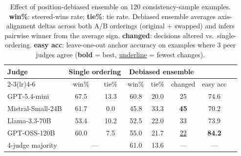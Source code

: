 \begin{table}[t]\centering\small
\setlength{\tabcolsep}{5pt}
\begin{tabular}{lccccccc}
\toprule
\textbf{Judge} &
  \multicolumn{2}{c}{\textbf{Single ordering}} &
  \multicolumn{3}{c}{\textbf{Debiased ensemble}} \\
\cmidrule(lr){2-3}\cmidrule(lr){4-6}
 & win\% & tie\% & win\% & tie\% & changed & easy acc \\
\midrule
GPT-5.4-mini      & 67.5 & 13.3 & 60.8 & 20.0 & 25 & 74.6 \\
Mistral-Small-24B & 61.7 &  0.0 & 45.8 & 33.3 & \textbf{45} & 70.2 \\
Llama-3.3-70B     & 53.4 & 10.2 & 52.5 & 22.0 & 33 & 73.9 \\
GPT-OSS-120B      & 60.0 &  7.5 & 55.0 & 21.7 & \underline{22} & \textbf{84.2} \\
\midrule
4-judge majority  & \multicolumn{2}{c}{---} & 61.0 & 13.6 & --- & --- \\
\bottomrule
\end{tabular}
\caption{%
  Effect of position-debiased ensemble on 120 consistency-sample examples.
  \textbf{win\%}: steered-wins rate; \textbf{tie\%}: tie rate.
  Debiased ensemble averages axis-alignment deltas across both A/B orderings
  (original + swapped) and infers pairwise winner from the average sign.
  \textbf{changed}: decisions altered vs.\ single-ordering.
  \textbf{easy acc}: leave-one-out anchor accuracy on examples where 3 peer judges agree
  (\textbf{bold} = best, \underline{underline} = fewest changes).
}
\label{tab:debiased-ensemble}
\end{table}
